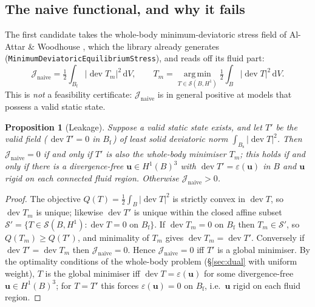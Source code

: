 \documentclass[11pt]{article}
\newtheorem{proposition}{Proposition}
\newcommand{\Jf}{\mathscr{J}}  %
\newcommand{\eps}{\varepsilon}
\newcommand{\Bs}{B_{\mathrm{s}}}
\newcommand{\Bf}{B_{\mathrm{f}}}
\newcommand{\bu}{\mathbf{u}}
\newcommand{\dV}{\,\mathrm{d}V}
\newcommand{\dev}{\operatorname{dev}}
\newcommand{\Ja}{\Jf _{\mathrm{naive}}}
\begin{document}
\subsection{The naive functional, and why it fails}
\label{sec:naive}

The first candidate takes the whole-body minimum-deviatoric stress field
of Al-Attar \& Woodhouse \cite[\S3.4]{AW10}, which the library already
generates (\texttt{MinimumDeviatoricEquilibriumStress}), and reads off
its fluid part:
\begin{equation}
  \Ja = \tfrac12\int_{\Bf} |\dev T_m|^{2}\dV , \qquad
  T_m = \operatorname*{arg\,min}_{T \in \mathcal{S}(B, H^1)}
        \tfrac12\int_{B} |\dev T|^{2}\dV .
  \label{eq:Jnaive}
\end{equation}
This is \emph{not} a feasibility certificate: $\Ja$ is in general
positive at models that possess a valid static state.

\begin{proposition}[Leakage]\label{prop:leakage}
Suppose a valid static state exists, and let $T'$ be the valid field
(\,$\dev T' = 0$ in $\Bf$\,) of least solid deviatoric norm
$\int_{\Bs}|\dev T|^2$. Then $\Ja = 0$ if and only if $T'$ is also the
whole-body minimiser $T_m$; this holds if and only if there is a
divergence-free $\bu \in H^1(B)^3$ with $\dev T' = \eps(\bu)$ in $B$ and
$\bu$ rigid on each connected fluid region. Otherwise $\Ja > 0$.
\end{proposition}
\begin{proof}
The objective $Q(T) = \frac12\int_B|\dev T|^2$ is strictly convex in
$\dev T$, so $\dev T_m$ is unique; likewise $\dev T'$ is unique within
the closed affine subset $\mathcal{S}' = \{T \in \mathcal{S}(B,H^1):
\dev T = 0 \text{ on } \Bf\}$. If $\dev T_m = 0$ on $\Bf$ then
$T_m \in \mathcal{S}'$, so $Q(T_m) \ge Q(T')$, and minimality of $T_m$
gives $\dev T_m = \dev T'$. Conversely if $\dev T' = \dev T_m$ then
$\Ja = 0$. Hence $\Ja = 0$ iff $T'$ is a global minimiser. By the
optimality conditions of the whole-body problem (\S\ref{sec:dual} with
uniform weight), $T$ is the global minimiser iff $\dev T = \eps(\bu)$
for some divergence-free $\bu \in H^1(B)^3$; for $T = T'$ this forces
$\eps(\bu) = 0$ on $\Bf$, i.e.\ $\bu$ rigid on each fluid region.
\end{proof}
\end{document}
